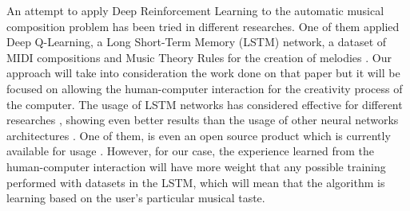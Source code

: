 An attempt to apply Deep Reinforcement Learning to the automatic musical composition problem has been tried in different researches. One of them applied Deep Q-Learning, a Long Short-Term Memory (LSTM) network, a dataset of MIDI compositions and Music Theory Rules for the creation of melodies \cite{deeprl2016music}. Our approach will take into consideration the work done on that paper but it will be focused on allowing the human-computer interaction for the creativity process of the computer. The usage of LSTM networks has considered effective for different researches \cite{deeprl2016music} \cite{eck2002blues}, showing even better results than the usage of other neural networks architectures \cite{briot2019survey}. One of them, is even an open source product which is currently available for usage \cite{magenta2018}. However, for our case, the experience learned from the human-computer interaction will have more weight that any possible training performed with datasets in the LSTM, which will mean that the algorithm is learning based on the user's particular musical taste.

